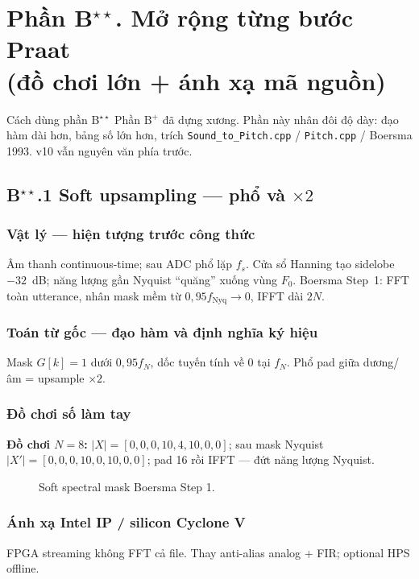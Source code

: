 
\section*{Phần B$^{\star\star}$. Mở rộng từng bước Praat\\(đồ chơi lớn + ánh xạ mã nguồn)}

\begin{firstprin}{Cách dùng phần B$^{\star\star}$}
Phần B$^+$ đã dựng xương. Phần này nhân đôi độ dày: đạo hàm dài hơn, bảng số lớn hơn, trích \texttt{Sound\_to\_Pitch.cpp} / \texttt{Pitch.cpp} / Boersma 1993. v10 vẫn nguyên văn phía trước.
\end{firstprin}

\subsection*{B$^{\star\star}$.1 Soft upsampling --- phổ và $\times2$}
\subsubsection*{Vật lý --- hiện tượng trước công thức}
Âm thanh continuous-time; sau ADC phổ lặp $f_s$. Cửa sổ Hanning tạo sidelobe $-32$~dB; năng lượng gần Nyquist ``quăng'' xuống vùng $F_0$. Boersma Step~1: FFT toàn utterance, nhân mask mềm từ $0{,}95 f_{\mathrm{Nyq}}\to0$, IFFT dài $2N$.
\subsubsection*{Toán từ gốc --- đạo hàm và định nghĩa ký hiệu}
Mask $G[k]=1$ dưới $0{,}95 f_N$, dốc tuyến tính về 0 tại $f_N$. Phổ pad giữa dương/âm = upsample $\times2$.
\subsubsection*{Đồ chơi số làm tay}
\textbf{Đồ chơi $N=8$:} $|X|=[0,0,0,10,4,10,0,0]$; sau mask Nyquist $|X'|=[0,0,0,10,0,10,0,0]$; pad 16 rồi IFFT --- đứt năng lượng Nyquist.
\begin{figure}[H]\centering
{}
\caption{Soft spectral mask Boersma Step 1.}
\end{figure}
\subsubsection*{Ánh xạ Intel IP / silicon Cyclone V}
FPGA streaming không FFT cả file. Thay anti-alias analog + FIR; optional HPS offline.
